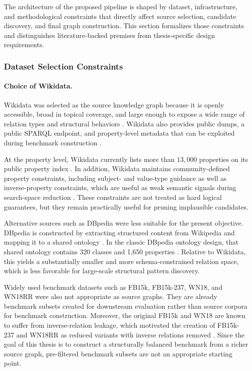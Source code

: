 \documentclass[12pt,a4paper]{article}
\begin{document}
The architecture of the proposed pipeline is shaped by dataset, infrastructure, and methodological constraints that directly affect source selection, candidate discovery, and final graph construction. This section formalizes those constraints and distinguishes literature-backed premises from thesis-specific design requirements.

\subsubsection{Dataset Selection Constraints}

\paragraph{Choice of Wikidata.}

Wikidata was selected as the source knowledge graph because it is openly accessible, broad in topical coverage, and large enough to expose a wide range of relation types and structural behaviors \cite{hosseini2024wikidata_subsetting}. Wikidata also provides public dumps, a public SPARQL endpoint, and property-level metadata that can be exploited during benchmark construction \cite{hosseini2024wikidata_subsetting,wikidata_constraints_portal,wikidata_inverse_constraint}.

At the property level, Wikidata currently lists more than $13{,}000$ properties on its public property index \cite{wikidata_list_properties_2025}. In addition, Wikidata maintains community-defined property constraints, including subject- and value-type guidance as well as inverse-property constraints, which are useful as weak semantic signals during search-space reduction \cite{wikidata_constraints_portal,wikidata_inverse_constraint}. These constraints are not treated as hard logical guarantees, but they remain practically useful for pruning implausible candidates.

Alternative sources such as DBpedia were less suitable for the present objective. DBpedia is constructed by extracting structured content from Wikipedia and mapping it to a shared ontology \cite{lehmann2015dbpedia}. In the classic DBpedia ontology design, that shared ontology contains 320 classes and 1,650 properties \cite{lehmann2015dbpedia}. Relative to Wikidata, this yields a substantially smaller and more schema-constrained relation space, which is less favorable for large-scale structural pattern discovery.

Widely used benchmark datasets such as FB15k, FB15k-237, WN18, and WN18RR were also not appropriate as source graphs. They are already benchmark subsets created for downstream evaluation rather than source corpora for benchmark construction. Moreover, the original FB15k and WN18 are known to suffer from inverse-relation leakage, which motivated the creation of FB15k-237 and WN18RR as reduced variants with inverse relations removed \cite{toutanova2015observed,dettmers2018conve}. Since the goal of this thesis is to construct a structurally balanced benchmark from a richer source graph, pre-filtered benchmark subsets are not an appropriate starting point.
\end{document}
